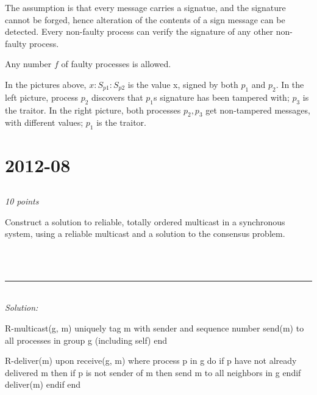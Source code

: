 \documentclass[a4paper]{article}
\newcommand{\horrule}[1]{\rule{\linewidth}{#1}} %
\newcommand{\points}[1]{\subsection{} \textit{#1 points}\\}
\newcommand{\question}[2][]{
  \noindent
  \parbox[t]{\textwidth}{#1 \parbox[t]{0.95\textwidth}{#2}}\\
}
\newcommand{\solution}[1]{\\\horrule{0.5pt}\\[3pt]\textit{Solution: }\\[0.1cm]\begin{minipage}{\textwidth}#1\end{minipage}}
\begin{document}
{  The assumption is that every message carries a signatue, and the
  signature cannot be forged, hence alteration of the contents of a
  sign message can be detected. Every non-faulty process can verify
  the signature of any other non-faulty process.

  Any number $f$ of faulty processes is allowed.

  \begin{minipage}{0.45\linewidth}
  \end{minipage}
  \begin{minipage}{0.45\linewidth}
  \end{minipage}

  In the pictures above, $x:S_{p1}:S_{p2}$ is the value x, signed by
  both $p_1$ and $p_2$. In the left picture, process $p_2$ discovers
  that $p_1$s signature has been tampered with; $p_3$ is the traitor.
  In the right picture, both processes $p_2, p_3$ get non-tampered
  messages, with different values; $p_1$ is the traitor.
}

\section{2012-08}
\points{10}
\question{
  Construct a solution to reliable, totally ordered multicast
  in a synchronous system, using a reliable multicast and a solution
  to the consensus problem.
}
\solution{
  R-multicast(g, m)
    uniquely tag m with sender and sequence number
    send(m) to all processes in group g (including self)
  end

  R-deliver(m)
  upon receive(g, m) where process p in g do
  if p have not already delivered m
  then if p is not sender of m
  then send m to all neighbors in g
  endif
  deliver(m)
  endif
  end
}
\end{document}
